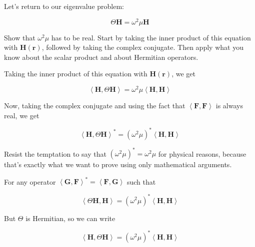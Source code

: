 Let's return to our eigenvalue problem:

\begin{equation}
\Theta {\mathbf H} = \omega^2 \mu {\mathbf H}
\end{equation} 

\begin{cue}
Show that $\omega^2 \mu$ has to be real. Start by taking the inner product of this equation with ${\mathbf H({\mathbf r})}$, followed by taking the complex conjugate. Then apply what you know about the scalar product and about Hermitian operators.    
\end{cue}

Taking the inner product of this equation with ${\mathbf H({\mathbf r})}$, we get

\begin{equation}
\left\langle{\mathbf H} , \Theta {\mathbf H}\right\rangle  = \omega^2 \mu \left\langle {\mathbf H} , {\mathbf H}\right\rangle \label{eq-real-eigen-1}
\end{equation}

Now, taking the complex conjugate and using the fact that $\left\langle {\mathbf F}, {\mathbf F}\right\rangle$ is always real, we get

\begin{equation}
\left\langle{\mathbf H} , \Theta {\mathbf H}\right\rangle^*  = (\omega^2 \mu)^* \left\langle {\mathbf H} , {\mathbf H}\right\rangle 
\end{equation} 

Resist the temptation to say that $(\omega^2 \mu)^*= \omega^2 \mu $ for physical reasons, because that's exactly what we want to prove using only mathematical arguments.

For any operator $\left\langle {\mathbf G}, {\mathbf F}\right\rangle ^*  = \left\langle {\mathbf F}, {\mathbf G}\right\rangle$ such that

\begin{equation}
\left\langle \Theta {\mathbf H} , {\mathbf H} \right\rangle  = (\omega^2 \mu)^* \left\langle {\mathbf H} , {\mathbf H}\right\rangle 
\end{equation} 

But $\Theta$ is Hermitian, so we can write

\begin{equation}
\left\langle {\mathbf H} , \Theta {\mathbf H} \right\rangle  = (\omega^2 \mu)^* \left\langle {\mathbf H} , {\mathbf H}\right\rangle \label{eq-real-eigen-2}
\end{equation} 

